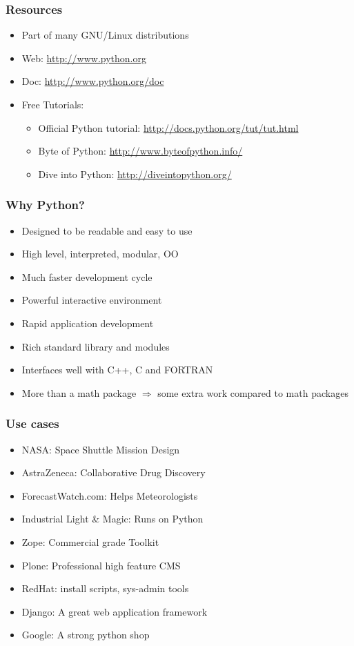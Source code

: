 \documentclass[14pt,compress]{beamer}
\begin{document}
\begin{frame}
  \frametitle{Resources}
  \begin{itemize}
  \item Part of many GNU/Linux distributions
  \item Web: \url{http://www.python.org}
  \item Doc: \url{http://www.python.org/doc}
  \item Free Tutorials:
    \begin{itemize}
    \item Official Python tutorial: \url{http://docs.python.org/tut/tut.html}
    \item Byte of Python: \url{http://www.byteofpython.info/}
    \item Dive into Python: \url{http://diveintopython.org/}
    \end{itemize}
  \end{itemize}
\end{frame}

\begin{frame}
  \frametitle{Why Python?}
  \begin{itemize}
  \item Designed to be readable and easy to use
  \item High level, interpreted, modular, OO
  \item Much faster development cycle
  \item Powerful interactive environment
  \item Rapid application development
  \item Rich standard library and modules
  \item Interfaces well with C++, C and FORTRAN
  \item \alert{More than a math package $\Rightarrow$ some extra work compared to math packages}
  \end{itemize}
\end{frame}

\begin{frame}
  \frametitle{Use cases}
  \begin{itemize}
  \item NASA: Space Shuttle Mission Design
  \item AstraZeneca: Collaborative Drug Discovery
  \item ForecastWatch.com: Helps Meteorologists
  \item Industrial Light \& Magic: Runs on Python
  \item Zope: Commercial grade Toolkit
  \item Plone: Professional high feature CMS
  \item RedHat: install scripts, sys-admin tools
  \item Django: A great web application framework
  \item Google: A strong python shop
  \end{itemize}
\end{frame}
\end{document}
